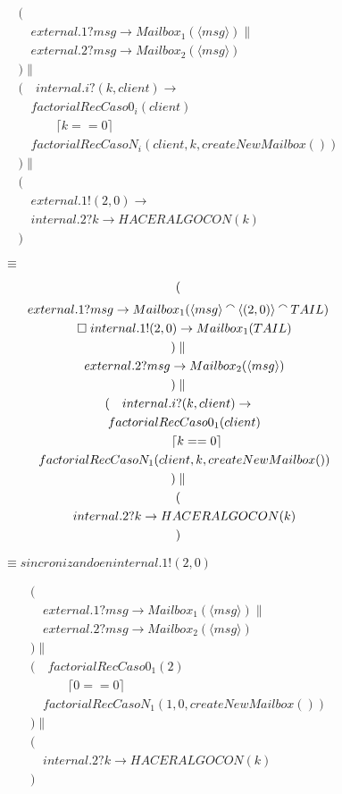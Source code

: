 \documentclass[fleqn]{article}
\newcommand{\myList}[1]{\langle #1 \rangle}
\newcommand{\myCons}[0]{\mathbin{\raise 0.8ex\hbox{$\smallfrown$}}}
\begin{document}
\begin{gather*}
( \\ 
\quad external.1?msg \rightarrow Mailbox_1(\myList{msg})  \parallel \\
\quad external.2?msg \rightarrow Mailbox_2(\myList{msg})  \\
) \parallel \\
(
\quad internal.i?(k,client) \rightarrow \\
\quad factorialRecCaso0_i(client) \\
\quad \qquad \lceil k == 0 \rceil \\
\quad factorialRecCasoN_i(client, k, createNewMailbox()) \\
) \parallel \\
( \\
\quad external.1!(2,0) \rightarrow \\
\quad internal.2?k \rightarrow HACERALGOCON(k) \\ 
)
\end{gather*}

$\qquad \qquad \equiv$

\begin{gather*}
( \\ 
external.1?msg \rightarrow Mailbox_1(\myList{msg} \myCons \myList{(2,0)} \myCons TAIL) \\ 
\quad \square \; internal.1!(2,0) \rightarrow Mailbox_1(TAIL) \\  
) \parallel \\
\quad external.2?msg \rightarrow Mailbox_2(\myList{msg})  \\
) \parallel \\
(
\quad internal.i?(k,client) \rightarrow \\
\quad factorialRecCaso0_1(client) \\
\quad \qquad \lceil k == 0 \rceil \\
\quad factorialRecCasoN_1(client, k, createNewMailbox()) \\
) \parallel \\
( \\
\quad internal.2?k \rightarrow HACERALGOCON(k) \\ 
)
\end{gather*}

$\qquad \qquad \equiv sincronizando en internal.1!(2,0)$

\begin{gather*}
( \\ 
\quad external.1?msg \rightarrow Mailbox_1(\myList{msg}) \parallel \\
\quad external.2?msg \rightarrow Mailbox_2(\myList{msg})  \\
) \parallel \\
(
\quad factorialRecCaso0_1(2) \\
\quad \qquad \lceil 0 == 0 \rceil \\
\quad factorialRecCasoN_1(1, 0, createNewMailbox()) \\
) \parallel \\
( \\
\quad internal.2?k \rightarrow HACERALGOCON(k) \\ 
)
\end{gather*}
\end{document}
